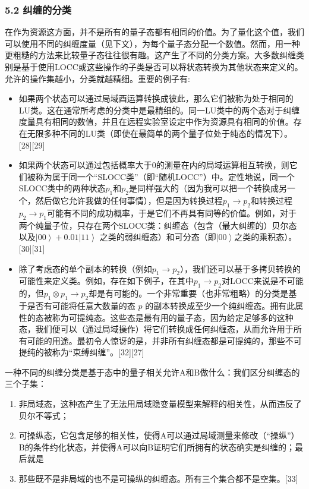 \subsubsection{5.2 纠缠的分类}
在作为资源这方面，并不是所有的量子态都有相同的价值。为了量化这个值，我们可以使用不同的纠缠度量（见下文），为每个量子态分配一个数值。然而，用一种更粗糙的方法来比较量子态往往很有趣。这产生了不同的分类方案。大多数纠缠类别是基于使用LOCC或这些操作的子类是否可以将状态转换为其他状态来定义的。允许的操作集越小，分类就越精细。重要的例子有:
\begin{itemize}
\item 如果两个状态可以通过局域酉运算转换成彼此，那么它们被称为处于相同的LU类。这在通常所考虑的分类中是最精细的。同一LU类中的两个态对于纠缠度量具有相同的数值，并且在远程实验室设定中作为资源具有相同的价值。存在无限多种不同的LU类（即使在最简单的两个量子位处于纯态的情况下）。[28][29]
\item 如果两个状态可以通过包括概率大于0的测量在内的局域运算相互转换，则它们被称为属于同一个“SLOCC类”（即“随机LOCC”）中。定性地说，同一个SLOCC类中的两种状态$p_{1}$和$p_{2}$是同样强大的（因为我可以把一个转换成另一个，然后做它允许我做的任何事情），但是因为转换过程$p_{1}\to p_{2}$和转换过程$p_{2}\to p_{1}$可能有不同的成功概率，于是它们不再具有同等的价值。例如，对于两个纯量子位，只存在两个SLOCC类：纠缠态（包含（最大纠缠的）贝尔态以及$\left|00\right\rangle + 0.01\left|11\right\rangle
 $ 之类的弱纠缠态）和可分态（即$\left|00\right\rangle$之类的乘积态）。[30][31]
\item 除了考虑态的单个副本的转换（例如$p_{1}\to p_{2}$），我们还可以基于多拷贝转换的可能性来定义类。例如，存在如下例子，在其中$p_{1}\to p_{2}$对LOCC来说是不可能的，但$p_{1}\otimes p_{1}\to p_{2}$却是有可能的。一个非常重要（也非常粗略）的分类是基于是否有可能将任意大数量的态 $p$ 的副本转换成至少一个纯纠缠态。拥有此属性的态被称为可提纯态。这些态是最有用的量子态，因为给定足够多的这种态，我们便可以（通过局域操作）将它们转换成任何纠缠态，从而允许用于所有可能的用途。最初令人惊讶的是，并非所有纠缠态都是可提纯的，那些不可提纯的被称为“束缚纠缠”。[32][27]
\end{itemize}

一种不同的纠缠分类是基于态中的量子相关允许A和B做什么：我们区分纠缠态的三个子集：
\begin{enumerate}
\item 非局域态，这种态产生了无法用局域隐变量模型来解释的相关性，从而违反了贝尔不等式；

\item 可操纵态，它包含足够的相关性，使得A可以通过局域测量来修改（“操纵”）B的条件约化状态，并使得A可以向B证明它们所拥有的状态确实是纠缠的；最后就是

\item 那些既不是非局域的也不是可操纵的纠缠态。所有三个集合都不是空集。[33]
\end{enumerate}
